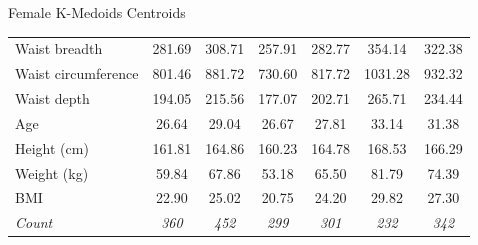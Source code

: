 \documentclass[10pt]{beamer}
\begin{document}
\begin{frame}{Female K-Medoids Centroids}
\begin{tabular}{lcccccc}
		Waist breadth                & 281.69                               & 308.71       & 257.91       & 282.77       & 354.14       & 322.38       \\
		Waist circumference          & 801.46                               & 881.72       & 730.60       & 817.72       & 1031.28      & 932.32       \\
		Waist depth                  & 194.05                               & 215.56       & 177.07       & 202.71       & 265.71       & 234.44       \\
		\hline
		Age                          & 26.64                                & 29.04        & 26.67        & 27.81        & 33.14        & 31.38        \\
		Height (cm)                  & 161.81                               & 164.86       & 160.23       & 164.78       & 168.53       & 166.29       \\
		Weight (kg)                  & 59.84                                & 67.86        & 53.18        & 65.50        & 81.79        & 74.39        \\
		BMI                          & 22.90                                & 25.02        & 20.75        & 24.20        & 29.82        & 27.30        \\
		\hline
		\textit{Count}               & \textit{360}                         & \textit{452} & \textit{299} & \textit{301} & \textit{232} & \textit{342}
	\end{tabular}
\end{frame}
\end{document}
